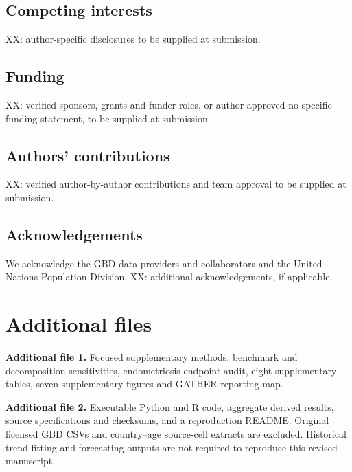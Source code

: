 \documentclass[11pt,a4paper]{article}
\begin{document}
\subsection*{Competing interests}
XX: author-specific disclosures to be supplied at submission.
\subsection*{Funding}
XX: verified sponsors, grants and funder roles, or author-approved no-specific-funding statement, to be supplied at submission.
\subsection*{Authors' contributions}
XX: verified author-by-author contributions and team approval to be supplied at submission.
\subsection*{Acknowledgements}
We acknowledge the GBD data providers and collaborators and the United Nations Population Division. XX: additional acknowledgements, if applicable.

\section*{Additional files}
\textbf{Additional file 1.} Focused supplementary methods, benchmark and decomposition sensitivities, endometriosis endpoint audit, eight supplementary tables, seven supplementary figures and GATHER reporting map.

\textbf{Additional file 2.} Executable Python and R code, aggregate derived results, source specifications and checksums, and a reproduction README. Original licensed GBD CSVs and country--age source-cell extracts are excluded. Historical trend-fitting and forecasting outputs are not required to reproduce this revised manuscript.
\end{document}
